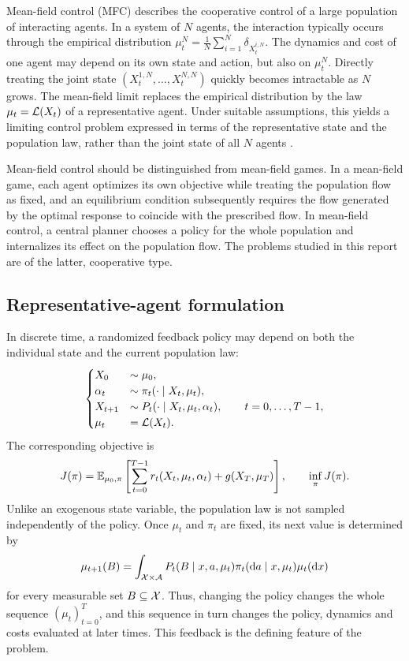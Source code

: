 Mean-field control (MFC) describes the cooperative control of a large population of interacting agents. In a system of $N$ agents, the interaction typically occurs through the empirical distribution $\mu_t^N = \frac1N\sum_{i=1}^N \delta_{X_t^{i,N}}$. The dynamics and cost of one agent may depend on its own state and action, but also on $\mu_t^N$. Directly treating the joint state $(X_t^{1,N},\ldots,X_t^{N,N})$ quickly becomes intractable as $N$ grows. The mean-field limit replaces the empirical distribution by the law $\mu_t={\cal L}(X_t)$ of a representative agent. Under suitable assumptions, this yields a limiting control problem expressed in terms of the representative state and the population law, rather than the joint state of all $N$ agents \cite{motte2022mean}.

Mean-field control should be distinguished from mean-field games. In a mean-field game, each agent optimizes its own objective while treating the population flow as fixed, and an equilibrium condition subsequently requires the flow generated by the optimal response to coincide with the prescribed flow. In mean-field control, a central planner chooses a policy for the whole population and internalizes its effect on the population flow. The problems studied in this report are of the latter, cooperative type.

\subsection{Representative-agent formulation}

In discrete time, a randomized feedback policy may depend on both the individual state and the current population law:
\begin{align}
    \label{eq:background-mfc_dynamics}
    \begin{cases}
        X_0 &\sim \mu_0,\\
        \alpha_t &\sim \pi_t(\cdot\mid X_t,\mu_t),\\
        X_{t+1} &\sim P_t(\cdot\mid X_t, \mu_t,\alpha_t), \qquad t=0,\ldots,T-1,\\
        \mu_t &= {\cal L}(X_t).
    \end{cases}
\end{align}
The corresponding objective is
\begin{align}
    \label{eq:background-mfc_objective}
    J(\pi) = \mathbb{E}_{\mu_0,\pi}\left[ \sum_{t=0}^{T-1} r_t(X_t,\mu_t,\alpha_t) + g(X_T,\mu_T) \right],\qquad \inf_\pi J(\pi).
\end{align}
Unlike an exogenous state variable, the population law is not sampled independently of the policy. Once $\mu_t$ and $\pi_t$ are fixed, its next value is determined by
\begin{align}
    \label{eq:background-mfc_flow}
    \mu_{t+1}(B) = \int_{{\cal X}\times{\cal A}} P_t(B\mid x,a,\mu_t) \pi_t(\mathrm{d} a\mid x,\mu_t)\mu_t(\mathrm{d} x)
\end{align}
for every measurable set $B\subseteq{\cal X}$. Thus, changing the policy changes the whole sequence $(\mu_t)_{t=0}^T$, and this sequence in turn changes the policy, dynamics and costs evaluated at later times. This feedback is the defining feature of the problem.

